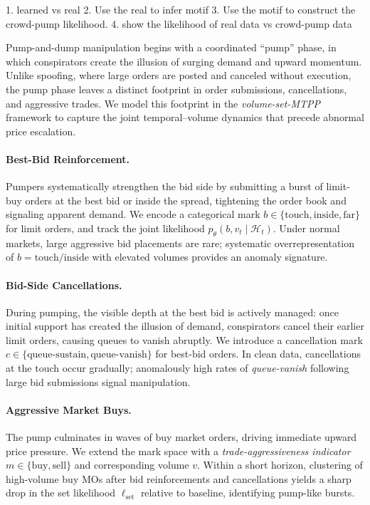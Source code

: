 1. learned vs real
2. Use the real to infer motif
3. Use the motif to construct the crowd-pump likelihood.
4. show the likelihood of real data vs crowd-pump data


Pump-and-dump manipulation begins with a coordinated ``pump'' phase, in which conspirators create the illusion of surging demand and upward momentum. Unlike spoofing, where large orders are posted and canceled without execution, the pump phase leaves a distinct footprint in order submissions, cancellations, and aggressive trades. We model this footprint in the \emph{volume-set-MTPP} framework to capture the joint temporal--volume dynamics that precede abnormal price escalation.

\paragraph{Best-Bid Reinforcement.}
Pumpers systematically strengthen the bid side by submitting a burst of limit-buy orders at the best bid or inside the spread, tightening the order book and signaling apparent demand. We encode a categorical mark $b \in \{\text{touch}, \text{inside}, \text{far}\}$ for limit orders, and track the joint likelihood $p_\theta(b, v_t \mid \mathcal{H}_t)$. Under normal markets, large aggressive bid placements are rare; systematic overrepresentation of $b=\text{touch/inside}$ with elevated volumes provides an anomaly signature.

\paragraph{Bid-Side Cancellations.}
During pumping, the visible depth at the best bid is actively managed: once initial support has created the illusion of demand, conspirators cancel their earlier limit orders, causing queues to vanish abruptly. We introduce a cancellation mark $c \in \{\text{queue-sustain}, \text{queue-vanish}\}$ for best-bid orders. In clean data, cancellations at the touch occur gradually; anomalously high rates of \emph{queue-vanish} following large bid submissions signal manipulation.

\paragraph{Aggressive Market Buys.}
The pump culminates in waves of buy market orders, driving immediate upward price pressure. We extend the mark space with a \emph{trade-aggressiveness indicator} $m \in \{\text{buy}, \text{sell}\}$ and corresponding volume $v$. Within a short horizon, clustering of high-volume buy MOs after bid reinforcements and cancellations yields a sharp drop in the set likelihood $\ell_{\text{set}}$ relative to baseline, identifying pump-like bursts.

